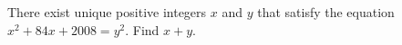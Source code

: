 There exist unique positive integers $ x$ and $ y$ that satisfy the equation $ x^2 + 84x + 2008 = y^2$. Find $ x + y$.
